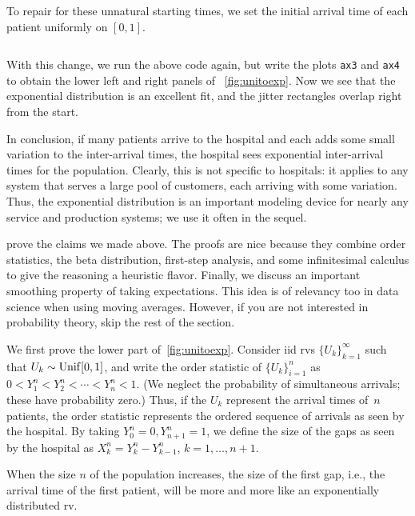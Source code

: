 \documentclass[queueing-book.tex]{subfiles}
\begin{document}
To repair for these unnatural starting times, we set the initial arrival time of each patient uniformly on $[0,1]$.
\inputminted[firstline=78, lastline=78]{python}{../code/IBD_simulations.py} %

With this change, we run the above code again, but write the plots \texttt{ax3} and \texttt{ax4} to obtain the lower left and right panels of ~\cref{fig:unitoexp}.
Now we see that the exponential distribution is an excellent fit, and the jitter rectangles overlap right from the start.

In conclusion, if many patients arrive to the hospital and each adds some small variation to the inter-arrival times, the hospital sees exponential inter-arrival times for the population.
Clearly, this is not specific to hospitals: it applies to any system that serves a large pool of customers, each arriving with some variation.
Thus, the exponential distribution is an important modeling device for nearly any service and production systems; we use it often in the sequel.

 prove the claims we made above.
The proofs are nice because they combine order statistics, the beta distribution, first-step analysis, and some infinitesimal calculus to give the reasoning a heuristic flavor.
Finally, we discuss an important smoothing property of taking expectations. This idea is of relevancy too in data science when using  moving averages.
However, if you are not interested in probability theory, skip the rest of the section.

We first prove the lower part of~\cref{fig:unitoexp}.
Consider iid rvs $\{U_k\}_{k=1}^{\infty}$ such that $U_{k}\sim \mathrm{Unif}[0,1]$, and write the order statistic of $\{U_k\}_{i=1}^{n}$ as $0<Y^{n}_1 < Y^n_2 < \cdots < Y_n^{n}<1$.
(We neglect the probability of simultaneous arrivals; these have probability zero.)
Thus, if the $U_{k}$ represent the arrival times of~$n$ patients, the order statistic represents the ordered sequence of arrivals as seen by the hospital.
By taking $Y_0^{n} = 0, Y_{n+1}^n=1$, we define the size of the gaps as seen by the hospital as $X_{k}^{n} = Y_k^n - Y_{k-1}^{n}$, $k=1, \ldots, n+1$.


When the size $n$ of the population increases, the size of the first gap, i.e., the arrival time of the first patient, will be more and more like an exponentially distributed rv.
\end{document}
